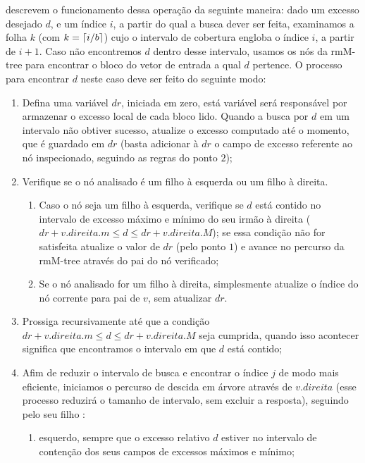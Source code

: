     \citet{paper-simple-and-efficient-fully-functional-succinct-trees} descrevem o funcionamento dessa operação da seguinte maneira: 
    dado um excesso desejado $d$, e um índice $i$, a partir do qual a busca dever ser feita, examinamos a folha $k$ (com $k= \lceil i/b\rceil$) 
    cujo o intervalo de cobertura engloba o índice $i$, a partir de $i+1$.
    Caso não encontremos $d$ dentro desse intervalo, usamos os nós da rmM-tree para encontrar o bloco do vetor de entrada a qual $d$ pertence.
    O processo para encontrar $d$ neste caso deve ser feito do seguinte modo:
    \begin{enumerate}
        \item Defina uma variável $dr$, iniciada em zero, está variável será responsável por armazenar o excesso local de cada bloco lido.
        Quando a busca por $d$ em um intervalo não obtiver sucesso, atualize o excesso computado até o momento, que é guardado em $dr$ 
        (basta adicionar à $dr$ o campo de excesso referente ao nó inspecionado, seguindo as regras do ponto $2$);
        \item Verifique se o nó analisado é um filho à esquerda ou um filho à direita.
        \begin{enumerate}
            \item Caso o nó seja um filho à esquerda, verifique se $d$ está contido no intervalo de excesso máximo e mínimo do seu irmão à 
            direita ($dr + v.direita.m \leq d \leq dr + v.direita.M$); se essa condição não for satisfeita atualize o valor de $dr$ (pelo ponto $1$) 
            e avance no percurso da rmM-tree através do pai do nó verificado;
            \item Se o nó analisado for um filho à direita, simplesmente atualize o índice do nó corrente para pai de $v$, sem atualizar $dr$.
        \end{enumerate}
        \item Prossiga recursivamente até que a condição $dr + v.direita.m \leq d \leq dr + v.direita.M$ seja cumprida, quando isso acontecer significa que encontramos o intervalo em que $d$ está contido;
        \item Afim de reduzir o intervalo de busca e encontrar o índice $j$ de modo mais eficiente, iniciamos o percurso de descida em árvore através de $v.direita$ (esse processo reduzirá o tamanho de intervalo, sem excluir a resposta), 
        seguindo pelo seu filho :
        \begin{enumerate}
            \item esquerdo, sempre que o excesso relativo $d$ estiver no intervalo de contenção dos seus campos de excessos máximos e mínimo;

\end{enumerate}
\end{enumerate}
